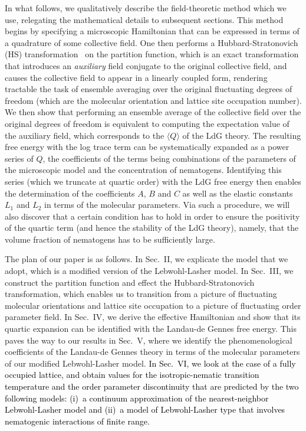 \documentclass[jcp,aps,twocolumn,showpacs,supergroupedaddress,epsfig,amsmath,amssymb,eqsecnum]{revtex4}
\newcommand{\bing}[1]{\textcolor{black}{#1}}
\begin{document}
In what follows, we qualitatively describe the field-theoretic method which we use, relegating the mathematical details to subsequent sections. This method begins by specifying a microscopic Hamiltonian that can be expressed in terms of a quadrature of some collective field. One then performs a Hubbard-Stratonovich (HS) transformation~\cite{stratonovich1958,hubbard1958,siegert1960} on the partition function, which is an exact transformation that introduces an {\em auxiliary} field conjugate to the original collective field, and causes the collective field to appear in a linearly coupled form, rendering tractable the task of ensemble averaging over the original fluctuating degrees of freedom (which are the molecular orientation and lattice site occupation number). We then show that performing an ensemble average of the collective field over the original degrees of freedom is equivalent to computing the expectation value of the auxiliary field, which corresponds to the $\langle Q \rangle$ of the LdG theory. The resulting free energy with the log trace term can be systematically expanded as a power series of $Q$, the coefficients of the terms being combinations of the parameters of the microscopic model and the concentration of nematogens. Identifying this series (which we truncate at quartic order) with the LdG free energy then enables the determination of the coefficients $A$, $B$ and $C$ as well as the elastic constants $L_1$ and $L_2$ in terms of the molecular parameters. Via such a procedure, we will also discover that a certain condition has to hold in order to ensure the positivity of the quartic term (and hence the stability of the LdG theory), namely, that the volume fraction of nematogens has to be sufficiently large. 

The plan of our paper is as follows. In Sec.~II, we explicate the model that we adopt, which is a modified version of the Lebwohl-Lasher model. In Sec.~III, we construct the partition function and effect the Hubbard-Stratonovich transformation, which enables us to transition from a picture of fluctuating molecular orientations and lattice site occupation to a picture of fluctuating order parameter field. In Sec.~IV, we derive the effective Hamiltonian and show that its quartic expansion can be identified with the Landau-de Gennes free energy. This paves the way to our results in Sec.~V, where we identify the phenomenological coefficients of the Landau-de Gennes theory in terms of the molecular parameters of our modified Lebwohl-Lasher model. \bing{In Sec.~VI, we look at the case of a fully occupied lattice, and obtain values for the isotropic-nematic transition temperature and the order parameter discontinuity that are predicted by the two following models: (i)~a continuum approximation of the nearest-neighbor Lebwohl-Lasher model and (ii)~a model of Lebwohl-Lasher type that involves nematogenic interactions of finite range.}
\end{document}
